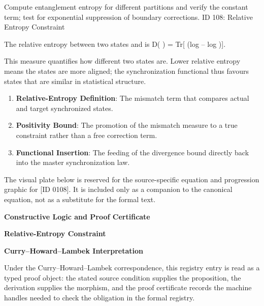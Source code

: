 Compute entanglement entropy for different partitions and verify the constant term; test for exponential suppression of boundary corrections. ID 108: Relative Entropy Constraint

The relative entropy between two states   and   is D(   ) = Tr[  (log   -- log  )].

This measure quantifies how different two states are. Lower relative entropy means the states are more aligned; the synchronization functional thus favours states that are similar in statistical structure.
\endgroup

\begin{enumerate}[leftmargin=1.6em,itemsep=6pt,topsep=4pt]
\item \textbf{Relative-Entropy Definition}: The mismatch term that compares actual and target synchronized states.
\item \textbf{Positivity Bound}: The promotion of the mismatch measure to a true constraint rather than a free correction term.
\item \textbf{Functional Insertion}: The feeding of the divergence bound directly back into the master synchronization law.
\end{enumerate}

\begingroup\footnotesize\sloppy
The visual plate below is reserved for the source-specific equation and progression graphic for [ID 0108]. It is included only as a companion to the canonical equation, not as a substitute for the formal text.
\par\endgroup
\ifTZPDarkEdition
{}
\fi

\clearpage
\begingroup\tzpsupportsetup
\noindent\textbf{\fontsize{10.8pt}{12.8pt}\selectfont [ID 0108] Constructive Logic and Proof Certificate}\par
\noindent\textbf{\fontsize{10pt}{12pt}\selectfont Relative-Entropy Constraint}\par
\vspace{0.45em}
\begingroup
\footnotesize
\setlength{\parskip}{0.22em}
\setlength{\parindent}{0pt}
\noindent\textbf{Curry--Howard--Lambek Interpretation}\par
Under the Curry--Howard--Lambek correspondence, this registry entry is read as a typed proof
object: the stated source condition supplies the proposition, the derivation supplies the
morphism, and the proof certificate records the machine handles needed to check the obligation
in the formal registry.

